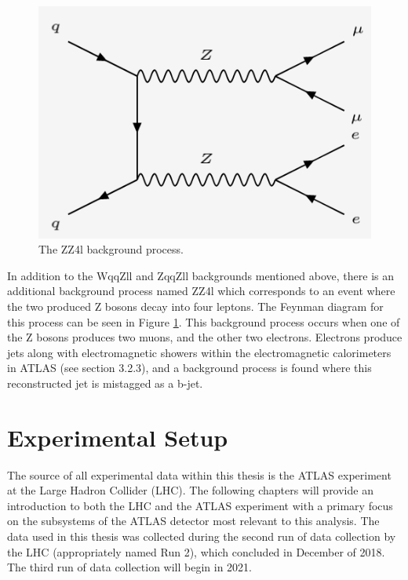 \documentclass[12pt,a4paper,epsf,portrait,times,epsfig]{article}
\begin{document}
		\begin{figure}[h!]
			\centering
			\includegraphics[scale=0.45]{ZZ4l}
			\caption{The ZZ4l background process.}
			\label{Fig:ZZ4lFeynman}
		\end{figure}
		
		
		In addition to the WqqZll and ZqqZll backgrounds mentioned above, there is an additional background process named ZZ4l which corresponds to an event where the two produced Z bosons decay into four leptons. The Feynman diagram for this process can be seen in Figure \ref{Fig:ZZ4lFeynman}. This background process occurs when one of the Z bosons produces two muons, and the other two electrons. Electrons produce jets along with
		electromagnetic showers within the electromagnetic calorimeters in ATLAS (see section 3.2.3), and a background process is found where this reconstructed jet is mistagged as a b-jet. \par
		
	\newpage

	\section{Experimental Setup}

		The source of all experimental data within this thesis is the ATLAS experiment at the Large Hadron Collider (LHC). The following chapters will provide an introduction to both the LHC and the ATLAS experiment with a primary focus on the subsystems of the ATLAS detector most relevant to this analysis. The data used in this thesis was collected during the second run of data collection by the LHC (appropriately named Run 2), which concluded in December of 2018. The third run of data collection will begin in 2021. 
\end{document}
